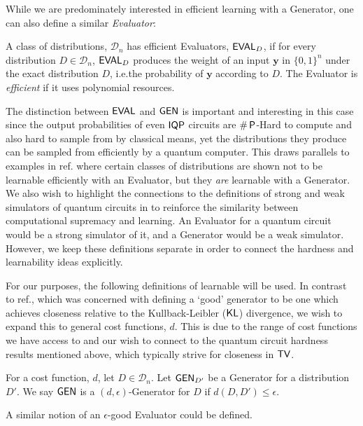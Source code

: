 While we are predominately interested in efficient learning with a Generator, one can also define a similar \textit{Evaluator}:
\begin{definition}\label{defn:evaluator_supp}
     A class of distributions, $\mathcal{D}_n$ has efficient Evaluators, $\operatorname{\textsf{EVAL}}_{D}$, if for every distribution $D \in \mathcal{D}_n$, $\operatorname{\textsf{EVAL}}_{D}$ produces the weight of an input $\mathbf{y}$ in $\{0, 1\}^n$ under the exact distribution $D$, i.e.\@ the probability of $\mathbf{y}$ according to $D$. The Evaluator is \emph{efficient} if it uses polynomial resources.
\end{definition}

The distinction between $\operatorname{\textsf{EVAL}}$ and $\operatorname{\textsf{GEN}}$ is important and interesting in this case since the output probabilities of even $\operatorname{\textsf{IQP}}$ circuits are $\#\operatorname{\textsf{P}}$-Hard to compute and also hard to sample from by classical means, yet the distributions they produce can be sampled from efficiently by a quantum computer. This draws parallels to examples in ref. where certain classes of distributions are shown not to be learnable efficiently with an Evaluator, but they \textit{are} learnable with a Generator. We also wish to highlight the connections to the definitions of strong and weak simulators of quantum circuits in  to reinforce the similarity between computational supremacy and learning. An Evaluator for a quantum circuit would be a strong simulator of it, and a Generator would be a weak simulator. However, we keep these definitions separate in order to connect the hardness and learnability ideas explicitly.

For our purposes, the following definitions of learnable will be used. In contrast to ref., which was concerned with defining a `good' generator to be one which achieves closeness relative to the Kullback-Leibler ($\operatorname{\textsf{KL}}$) divergence, we wish to expand this to general cost functions, $d$. This is due to the range of cost functions we have access to and our wish to connect to the quantum circuit hardness results mentioned above, which typically strive for closeness in $\operatorname{\textsf{TV}}$. %
\begin{definition}
    For a cost function, $d$, let $D \in \mathcal{D}_n$. Let $\operatorname{\textsf{GEN}}_{D'}$ be a Generator for a distribution $D'$. We say $\operatorname{\textsf{GEN}}$ is a $\left( d , \epsilon \right)$-Generator for $D$ if $d(D, D') \leq \epsilon$.
\end{definition}
A similar notion of an $\epsilon$-good Evaluator could be defined.

